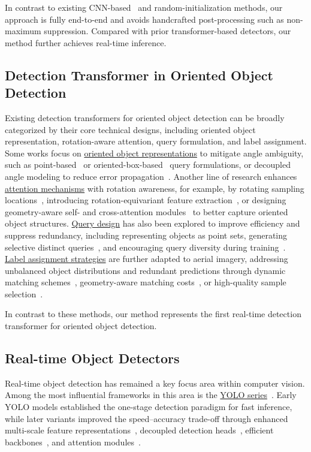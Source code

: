\documentclass[lettersize,journal]{IEEEtran}
\begin{document}
In contrast to existing CNN-based~\cite{msc,friou,wsod,10473137,guo2025multi} and random-initialization methods, our approach is fully end-to-end and avoids handcrafted post-processing such as non-maximum suppression. Compared with prior transformer-based detectors, our method further achieves real-time inference.



\subsection{Detection Transformer in Oriented Object Detection}

Existing detection transformers for oriented object detection can be broadly categorized by their core technical designs, including oriented object representation, rotation-aware attention, query formulation, and label assignment.
Some works focus on \underline{oriented object representations} to mitigate angle ambiguity, such as point-based~\cite{orienteddetr} or oriented-box-based~\cite{ro2detr} query formulations, or decoupled angle modeling to reduce error propagation~\cite{orienteddino}. 
Another line of research enhances \underline{attention mechanisms} with rotation awareness, for example, by rotating sampling locations~\cite{arsdetr}, introducing rotation-equivariant feature extraction~\cite{ro2detr}, or designing geometry-aware self- and cross-attention modules~\cite{orientedformer} to better capture oriented object structures.
\underline{Query design} has also been explored to improve efficiency and suppress redundancy, including representing objects as point sets, generating selective distinct queries~\cite{rqformer}, and encouraging query diversity during training~\cite{orienteddino}.
\underline{Label assignment strategies} are further adapted to aerial imagery, addressing unbalanced object distributions and redundant predictions through dynamic matching schemes~\cite{ro2detr}, geometry-aware matching costs~\cite{rhino}, or high-quality sample selection~\cite{emo2detr}.

In contrast to these methods, our method represents the first real-time detection transformer for oriented object detection.

\differentConfThre
\NMSAP



\subsection{Real-time Object Detectors}
Real-time object detection has remained a key focus area within computer vision. Among the most influential frameworks in this area is the \underline{YOLO series}~\cite{yolov1}. Early YOLO models established the one-stage detection paradigm for fast inference, while later variants improved the speed–accuracy trade-off through enhanced multi-scale feature representations~\cite{yolov6}, decoupled detection heads~\cite{yolov8}, efficient backbones~\cite{yolov9}, and attention modules~\cite{yolov12}.
\end{document}
